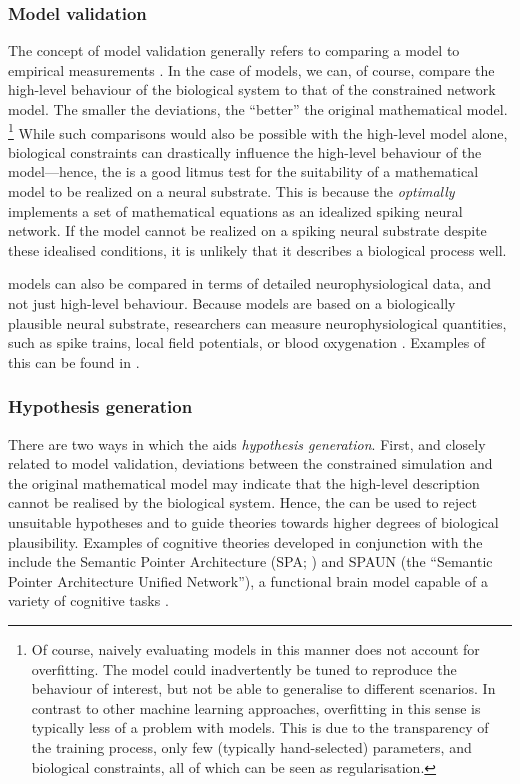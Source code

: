 \subsubsection{Model validation}
The concept of model validation generally refers to comparing a model to empirical measurements \citep{adams2012assessing}.
In the case of \NEF models, we can, of course, compare the high-level behaviour of the biological system to that of the constrained network model.
The smaller the deviations, the \enquote{better} the original mathematical model.%
\footnote{Of course, naively evaluating models in this manner does not account for overfitting. The model could inadvertently be tuned to reproduce the behaviour of interest, but not be able to generalise to different scenarios. In contrast to other machine learning approaches, overfitting in this sense is typically less of a problem with \NEF models.
This is due to the transparency of the training process, only few (typically hand-selected) parameters, and biological constraints, all of which can be seen as regularisation.}
While such comparisons would also be possible with the high-level model alone, biological constraints can drastically influence the high-level behaviour of the model---hence, the \NEF is a good litmus test for the suitability of a mathematical model to be realized on a neural substrate.
This is because the \NEF \emph{optimally} implements a set of mathematical equations as an idealized spiking neural network.
If the model cannot be realized on a spiking neural substrate despite these idealised conditions, it is unlikely that it describes a biological process well.

\NEF models can also be compared in terms of detailed neurophysiological data, and not just high-level behaviour.
Because \NEF models are based on a biologically plausible neural substrate, researchers can measure neurophysiological quantities, such as spike trains, local field potentials, or blood oxy\-gen\-ation \citep[Chapters 5.8~\&~9.4]{eliasmith2013how}.
Examples of this can be found in \citet{stewart2012learning,bekolay2014spiking,duggins2017effects,voelker2018improving,gosmann2021cue}.

\subsubsection{Hypothesis generation}
There are two ways in which the \NEF aids \emph{hypothesis generation}.
First, and closely related to model validation, deviations between the constrained simulation and the original mathematical model may indicate that the high-level description cannot be realised by the biological system.
Hence, the \NEF can be used to reject unsuitable hypotheses and to guide theories towards higher degrees of biological plausibility.
Examples of cognitive theories developed in conjunction with the \NEF include the Semantic Pointer Architecture (SPA; \cite{eliasmith2013how}) and SPAUN (the \enquote{Semantic Pointer Architecture Unified Network}), a functional brain model capable of a variety of cognitive tasks \citep{eliasmith2012largescale}.

